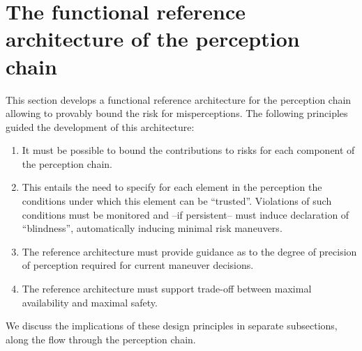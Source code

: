 \section{The functional reference architecture of the perception chain}\label{sec:refarchitecture}
This section develops a functional reference architecture for the perception chain allowing to provably bound the risk for misperceptions. The following principles guided the development of this architecture:
\begin{enumerate}
\item It must be possible to bound the contributions to risks for each component of the perception chain.
\item This entails the need to specify for each element in the perception the conditions under which this element can be \enquote{trusted}. Violations of such conditions must be monitored and --if persistent-- must induce declaration of \enquote{blindness}, automatically inducing minimal risk maneuvers.
\item The reference architecture must provide guidance as to the degree of precision of perception required for current maneuver decisions.
\item The reference architecture must support trade-off between maximal availability and maximal safety.
\end{enumerate}
We discuss the implications of these design principles in separate subsections, along the flow through the perception chain.
